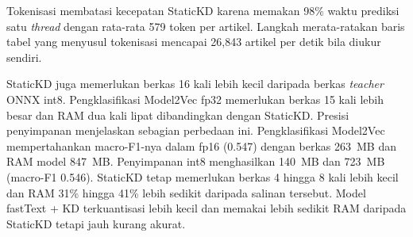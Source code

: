 \documentclass{ieeeaccess}
\newcommand{\en}[1]{\textit{#1}}
\begin{document}
Tokenisasi membatasi kecepatan StaticKD karena memakan 98\% waktu prediksi satu \en{thread} dengan rata-rata 579 token per artikel. Langkah merata-ratakan baris tabel yang menyusul tokenisasi mencapai 26,843 artikel per detik bila diukur sendiri.

StaticKD juga memerlukan berkas 16 kali lebih kecil daripada berkas \en{teacher} ONNX int8. Pengklasifikasi Model2Vec fp32 memerlukan berkas 15 kali lebih besar dan RAM dua kali lipat dibandingkan dengan StaticKD.
Presisi penyimpanan menjelaskan sebagian perbedaan ini. Pengklasifikasi Model2Vec mempertahankan macro-F1-nya dalam fp16 (0.547) dengan berkas 263~MB dan RAM model 847~MB. Penyimpanan int8 menghasilkan 140~MB dan 723~MB (macro-F1 0.546). StaticKD tetap memerlukan berkas 4 hingga 8 kali lebih kecil dan RAM 31\% hingga 41\% lebih sedikit daripada salinan tersebut.
Model fastText + KD terkuantisasi lebih kecil dan memakai lebih sedikit RAM daripada StaticKD tetapi jauh kurang akurat.
\end{document}
